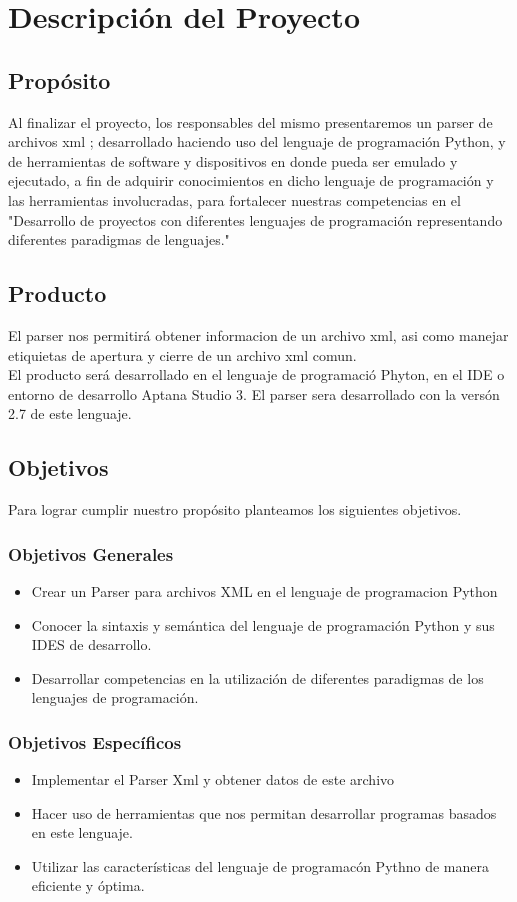 \documentclass[11pt]{article} %
\begin{document}
\section{\textbf{Descripci\'on del Proyecto}}
\subsection{\textbf{Prop\'osito}}
Al finalizar el proyecto, los responsables del mismo presentaremos un parser de archivos xml ; desarrollado haciendo uso del lenguaje de programaci\'on Python, y de herramientas de software y dispositivos en donde pueda ser emulado y ejecutado, a fin de adquirir conocimientos en dicho lenguaje de programaci\'on y las herramientas involucradas, para fortalecer nuestras competencias en el "Desarrollo de proyectos con diferentes lenguajes de programaci\'on representando diferentes paradigmas de lenguajes."
\subsection{\textbf{Producto}}
El parser nos permitir\'a obtener informacion de un archivo xml, asi como manejar etiquietas de apertura y cierre de un archivo xml comun.
\\El producto ser\'a desarrollado en el lenguaje de programaci\'o Phyton, en el IDE o entorno de desarrollo Aptana Studio 3. El parser sera desarrollado con la vers\'on 2.7 de este lenguaje.
\subsection{\textbf{Objetivos}}
Para lograr cumplir nuestro prop\'osito planteamos los siguientes objetivos.
\subsubsection{\textbf{Objetivos Generales}}
\begin{itemize}
\item Crear un Parser para archivos XML en el lenguaje de programacion Python
\item Conocer la sintaxis y sem\'antica del lenguaje de programaci\'on Python y sus IDES de desarrollo.
\item Desarrollar competencias en la utilizaci\'on de diferentes paradigmas de los lenguajes de programaci\'on.
\end{itemize}
\subsubsection{\textbf{Objetivos Espec\'ificos}}
\begin{itemize}
\item Implementar el Parser Xml y obtener datos de este archivo
\item Hacer uso de herramientas que nos permitan desarrollar programas basados en este lenguaje.
\item Utilizar las caracter\'isticas del lenguaje de programac\'on  Pythno de manera eficiente y \'optima.
\end{itemize}
\end{document}
